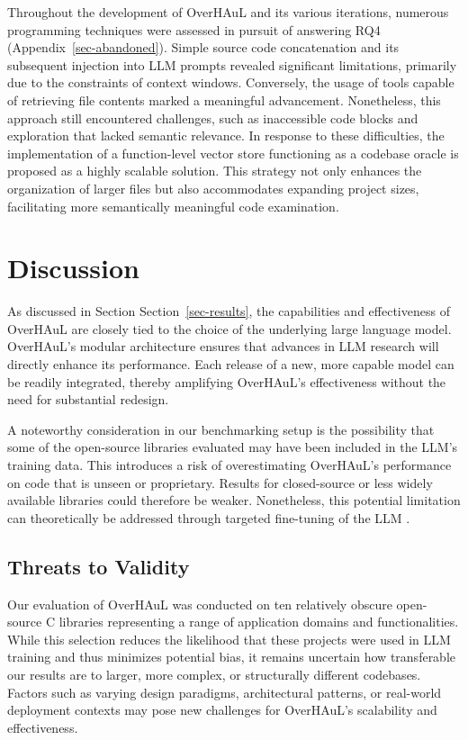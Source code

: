 \documentclass[
  a4paper,
]{scrreprt}
\theoremstyle{definition}
\theoremstyle{remark}
\begin{document}
Throughout the development of OverHAuL and its various iterations,
numerous programming techniques were assessed in pursuit of answering
RQ4 (Appendix~\ref{sec-abandoned}). Simple source code concatenation and
its subsequent injection into LLM prompts revealed significant
limitations, primarily due to the constraints of context windows.
Conversely, the usage of tools capable of retrieving file contents
marked a meaningful advancement. Nonetheless, this approach still
encountered challenges, such as inaccessible code blocks and exploration
that lacked semantic relevance. In response to these difficulties, the
implementation of a function-level vector store functioning as a
codebase oracle is proposed as a highly scalable solution. This strategy
not only enhances the organization of larger files but also accommodates
expanding project sizes, facilitating more semantically meaningful code
examination.

\section{Discussion}\label{discussion}

As discussed in Section Section~\ref{sec-results}, the capabilities and
effectiveness of OverHAuL are closely tied to the choice of the
underlying large language model. OverHAuL's modular architecture ensures
that advances in LLM research will directly enhance its performance.
Each release of a new, more capable model can be readily integrated,
thereby amplifying OverHAuL's effectiveness without the need for
substantial redesign.

A noteworthy consideration in our benchmarking setup is the possibility
that some of the open-source libraries evaluated may have been included
in the LLM's training data. This introduces a risk of overestimating
OverHAuL's performance on code that is unseen or proprietary. Results
for closed-source or less widely available libraries could therefore be
weaker. Nonetheless, this potential limitation can theoretically be
addressed through targeted fine-tuning of the LLM
\autocite{openaidocs2025b,kim2025}.

\subsection{Threats to Validity}\label{threats-to-validity}

Our evaluation of OverHAuL was conducted on ten relatively obscure
open-source C libraries representing a range of application domains and
functionalities. While this selection reduces the likelihood that these
projects were used in LLM training and thus minimizes potential bias, it
remains uncertain how transferable our results are to larger, more
complex, or structurally different codebases. Factors such as varying
design paradigms, architectural patterns, or real-world deployment
contexts may pose new challenges for OverHAuL's scalability and
effectiveness.
\end{document}
